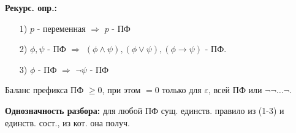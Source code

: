 \textbf{Рекурс. опр.:}
\begin{itemize}
    \item [1) ] $p$ - переменная $\Rightarrow$ $p$ - ПФ 
    \item [2) ] $\phi, \psi$ - ПФ $\Rightarrow$ $(\phi \land \psi), (\phi \lor \psi), (\phi \rightarrow \psi)$ - ПФ.
    \item [3) ] $\phi$ - ПФ $\Rightarrow$ $\neg\psi$ - ПФ
\end{itemize}

\begin{lemma}[О балансе]
Баланс префикса ПФ $\geq 0$, при этом $ = 0$ только для $\varepsilon$, всей ПФ или $\neg\neg\ldots\neg$.
\end{lemma}
\begin{note}
\textbf{Однозначность разбора:} для любой ПФ сущ. единств. правило из (1-3) и единств. сост., из кот. она получ.
\end{note}

